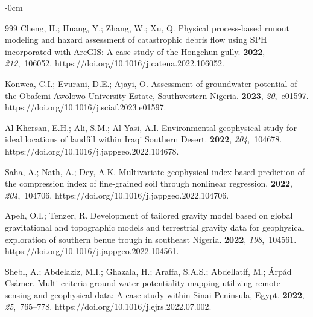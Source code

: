\documentclass[minerals,article,accept,pdftex,moreauthors]{Definitions/mdpi}
\begin{document}
\begin{adjustwidth}{-\extralength}{0cm}
\begin{thebibliography}{999}
Cheng, H.; Huang, Y.; Zhang, W.; Xu, Q.
\newblock Physical process-based runout modeling and hazard assessment of
  catastrophic debris flow using SPH incorporated with ArcGIS: A case study of
  the Hongchun gully.
 {\bf 2022}, {\em 212},~106052.
\newblock https://doi.org/10.1016/j.catena.2022.106052.

Konwea, C.I.; Evurani, D.E.; Ajayi, O.
\newblock Assessment of groundwater potential of the Obafemi Awolowo University
  Estate, Southwestern Nigeria.
 {\bf 2023}, {\em 20},~e01597.
\newblock https://doi.org/10.1016/j.sciaf.2023.e01597.

Al-Khersan, E.H.; Ali, S.M.; Al-Yasi, A.I.
\newblock Environmental geophysical study for ideal locations of landfill
  within Iraqi Southern Desert.
 {\bf 2022}, {\em 204},~104678.
\newblock https://doi.org/10.1016/j.jappgeo.2022.104678.

Saha, A.; Nath, A.; Dey, A.K.
\newblock Multivariate geophysical index-based prediction of the compression
  index of fine-grained soil through nonlinear regression.
 {\bf 2022}, {\em 204},~104706.
\newblock https://doi.org/10.1016/j.jappgeo.2022.104706.

Apeh, O.I.; Tenzer, R.
\newblock Development of tailored gravity model based on global gravitational
  and topographic models and terrestrial gravity data for geophysical
  exploration of southern benue trough in southeast Nigeria.
 {\bf 2022}, {\em 198},~104561.
\newblock https://doi.org/10.1016/j.jappgeo.2022.104561.

Shebl, A.; Abdelaziz, M.I.; Ghazala, H.; Araffa, S.A.S.; Abdellatif, M.;
  Árpád Csámer.
\newblock Multi-criteria ground water potentiality mapping utilizing remote
  sensing and geophysical data: A case study within Sinai Peninsula, Egypt.
 {\bf
  2022}, {\em 25},~765--778.
\newblock https://doi.org/10.1016/j.ejrs.2022.07.002.


\end{thebibliography}
\end{adjustwidth}
\end{document}
